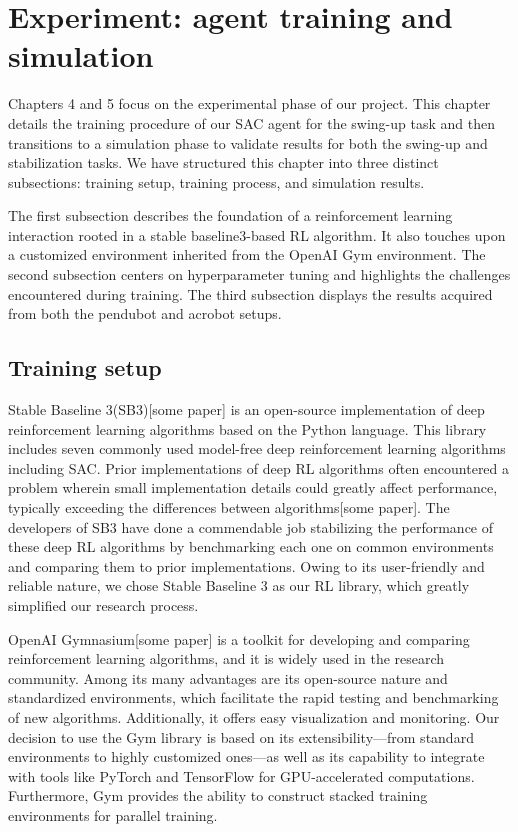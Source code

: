 \chapter{Experiment: agent training and simulation}
Chapters 4 and 5 focus on the experimental phase of our project. This chapter details the training procedure of our SAC agent for the swing-up task and then transitions to a simulation phase to validate results for both the swing-up and stabilization tasks. We have structured this chapter into three distinct subsections: training setup, training process, and simulation results.

The first subsection describes the foundation of a reinforcement learning interaction rooted in a stable baseline3-based RL algorithm. It also touches upon a customized environment inherited from the OpenAI Gym environment. The second subsection centers on hyperparameter tuning and highlights the challenges encountered during training. The third subsection displays the results acquired from both the pendubot and acrobot setups.
\section{Training setup}
Stable Baseline 3(SB3)[some paper] is an open-source implementation of deep reinforcement learning algorithms based on the Python language. This library includes seven commonly used model-free deep reinforcement learning algorithms including SAC. Prior implementations of deep RL algorithms often encountered a problem wherein small implementation details could greatly affect performance, typically exceeding the differences between algorithms[some paper]. The developers of SB3 have done a commendable job stabilizing the performance of these deep RL algorithms by benchmarking each one on common environments and comparing them to prior implementations. Owing to its user-friendly and reliable nature, we chose Stable Baseline 3 as our RL library, which greatly simplified our research process.

OpenAI Gymnasium[some paper] is a toolkit for developing and comparing reinforcement learning algorithms, and it is widely used in the research community. Among its many advantages are its open-source nature and standardized environments, which facilitate the rapid testing and benchmarking of new algorithms. Additionally, it offers easy visualization and monitoring. Our decision to use the Gym library is based on its extensibility—from standard environments to highly customized ones—as well as its capability to integrate with tools like PyTorch and TensorFlow for GPU-accelerated computations. Furthermore, Gym provides the ability to construct stacked training environments for parallel training.

